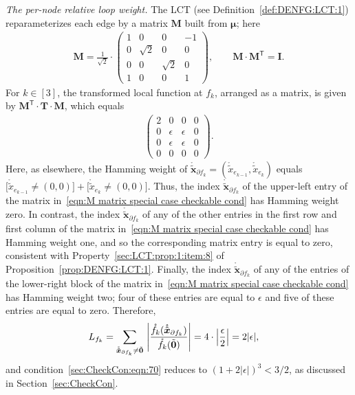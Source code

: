 \documentclass[journal]{IEEEtran}
\newcommand{\add}[1]{{\color{black}#1}}
\newcommand{\vect}[1]{ \bm{#1} }
\newcommand{\setpf}{ \partial f }
\newcommand{\tran}{\mathsf{T}}
\newcommand{\vmu}{ \vect{ \mu } }
\newcommand{\matr}[1]{\vect{#1}}
\newcommand{\LCTtv}[1]{ \mathring{ \tilde{ \vect{#1} } } }
\newcommand{\LCT}[1]{ \mathring{#1} }
\newcommand{\LCTt}[1]{ \mathring{ \tilde{#1} } }
\newcommand{\tv}[1]{ \tilde{\vect{#1}} }
\begin{document}
\begin{appendices}
{    \emph{The per-node relative loop weight.} The LCT (see
    Definition~\ref{def:DENFG:LCT:1}) \add{reparameterizes} each edge by a
    matrix $\matr{M}$ built from $\vmu$; here
    \begin{align*}
      \matr{M} =
      \frac{1}{\sqrt{2}}
      \cdot
      \begin{pmatrix}
        1 & 0        & 0        & -1 \\
        0 & \sqrt{2} & 0        & 0  \\
        0 & 0        & \sqrt{2} & 0  \\
        1 & 0        & 0        & 1
      \end{pmatrix},
      \qquad
      \matr{M} \cdot \matr{M}^{\tran} = \matr{I} .
    \end{align*}
    For $k \in [3]$, the transformed local function at $f_k$, arranged as a
    matrix, is given by $\matr{M}^{\tran} \cdot \matr{T} \cdot \matr{M}$,
    which equals
    \begin{align}
      \left(
      \begin{array}{c|ccc}
        2 & 0        & 0        & 0 \\
        \hline
        0 & \epsilon & \epsilon & 0 \\
        0 & \epsilon & \epsilon & 0 \\
        0 & 0        & 0        & 0
      \end{array}
      \right) .
      \label{eqn:M matrix special case checkable cond}
    \end{align}
    Here, as elsewhere, the Hamming weight of
    $\LCTtv{x}_{\setpf_k} = (\LCTt{x}_{e_{k-1}},\LCTt{x}_{e_k})$ equals
    $\bigl[ \LCTt{x}_{e_{k-1}} \neq (0,0) \bigr] + \bigl[ \LCTt{x}_{e_k} \neq
        (0,0) \bigr]$. Thus, the index $\LCTtv{x}_{\setpf_k}$ of the upper-left
    entry of the matrix in~\eqref{eqn:M matrix special case checkable cond}
    has Hamming weight zero. In contrast, the index $\LCTtv{x}_{\setpf_k}$ of
    any of the other entries in the first row and first column of the matrix
    in~\eqref{eqn:M matrix special case checkable cond} has Hamming weight
    one, and so the corresponding matrix entry is equal to zero, consistent
    with Property~\ref{sec:LCT:prop:1:item:8} of
    Proposition~\ref{prop:DENFG:LCT:1}. Finally, the index
    $\LCTtv{x}_{\setpf_k}$ of any of the entries of the lower-right block of
    the matrix in~\eqref{eqn:M matrix special case checkable cond} has Hamming
    weight two; four of these entries are equal to $\epsilon$ and five of
    these entries are equal to zero. Therefore,
    \begin{align*}
      L_{f_k}
       & = \sum_{ \LCTtv{x}_{\setpf_{k}} \neq \tv{0} } \
      \Biggl|
      \frac{\LCT{f_k}( \LCTtv{x}_{\setpf_{k}} )}
      {\LCT{f_k}(\tv{0}) }
      \Biggr|
      = 4 \cdot \Bigl| \frac{\epsilon}{2} \Bigr|
      = 2 |\epsilon|,
    \end{align*}
    and condition~\eqref{sec:CheckCon:eqn:70} reduces to
    $(1 + 2|\epsilon|)^{3} < 3/2$, as discussed in
    Section~\ref{sec:CheckCon}.}

\end{appendices}

\begin{footnotesize}
  
  
\end{footnotesize}
\end{document}
